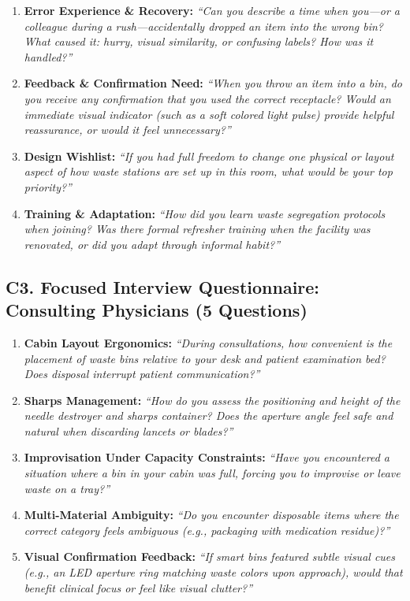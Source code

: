 \documentclass[11pt,a4paper]{article}
\begin{document}
\begin{enumerate}[leftmargin=*, itemsep=3pt]
    \item \textbf{Error Experience \& Recovery:} \emph{``Can you describe a time when you---or a colleague during a rush---accidentally dropped an item into the wrong bin? What caused it: hurry, visual similarity, or confusing labels? How was it handled?''}
    \item \textbf{Feedback \& Confirmation Need:} \emph{``When you throw an item into a bin, do you receive any confirmation that you used the correct receptacle? Would an immediate visual indicator (such as a soft colored light pulse) provide helpful reassurance, or would it feel unnecessary?''}
    \item \textbf{Design Wishlist:} \emph{``If you had full freedom to change one physical or layout aspect of how waste stations are set up in this room, what would be your top priority?''}
    \item \textbf{Training \& Adaptation:} \emph{``How did you learn waste segregation protocols when joining? Was there formal refresher training when the facility was renovated, or did you adapt through informal habit?''}
\end{enumerate}

\subsection{C3. Focused Interview Questionnaire: Consulting Physicians (5 Questions)}
\begin{enumerate}[leftmargin=*, itemsep=3pt]
    \item \textbf{Cabin Layout Ergonomics:} \emph{``During consultations, how convenient is the placement of waste bins relative to your desk and patient examination bed? Does disposal interrupt patient communication?''}
    \item \textbf{Sharps Management:} \emph{``How do you assess the positioning and height of the needle destroyer and sharps container? Does the aperture angle feel safe and natural when discarding lancets or blades?''}
    \item \textbf{Improvisation Under Capacity Constraints:} \emph{``Have you encountered a situation where a bin in your cabin was full, forcing you to improvise or leave waste on a tray?''}
    \item \textbf{Multi-Material Ambiguity:} \emph{``Do you encounter disposable items where the correct category feels ambiguous (e.g., packaging with medication residue)?''}
    \item \textbf{Visual Confirmation Feedback:} \emph{``If smart bins featured subtle visual cues (e.g., an LED aperture ring matching waste colors upon approach), would that benefit clinical focus or feel like visual clutter?''}
\end{enumerate}
\end{document}

